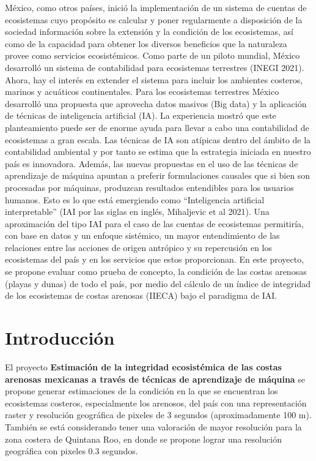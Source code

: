 \documentclass[
  letterpaper,
  DIV=11,
  numbers=noendperiod]{scrreprt}
\begin{document}
México, como otros países, inició la implementación de un sistema de
cuentas de ecosistemas cuyo propósito es calcular y poner regularmente a
disposición de la sociedad información sobre la extensión y la condición
de los ecosistemas, así como de la capacidad para obtener los diversos
beneficios que la naturaleza provee como servicios ecosistémicos. Como
parte de un piloto mundial, México desarrolló un sistema de contabilidad
para ecosistemas terrestres (INEGI 2021). Ahora, hay el interés en
extender el sistema para incluir los ambientes costeros, marinos y
acuáticos continentales. Para los ecosistemas terrestres México
desarrolló una propuesta que aprovecha datos masivos (Big data) y la
aplicación de técnicas de inteligencia artificial (IA). La experiencia
mostró que este planteamiento puede ser de enorme ayuda para llevar a
cabo una contabilidad de ecosistemas a gran escala. Las técnicas de IA
son atípicas dentro del ámbito de la contabilidad ambiental y por tanto
se estima que la estrategia iniciada en nuestro país es innovadora.
Además, las nuevas propuestas en el uso de las técnicas de aprendizaje
de máquina apuntan a preferir formulaciones causales que si bien son
procesadas por máquinas, produzcan resultados entendibles para los
usuarios humanos. Esto es lo que está emergiendo como ``Inteligencia
artificial interpretable'' (IAI por las siglas en inglés, Mihaljevic et
al 2021). Una aproximación del tipo IAI para el caso de las cuentas de
ecosistemas permitiría, con base en datos y un enfoque sistémico, un
mayor entendimiento de las relaciones entre las acciones de origen
antrópico y su repercusión en los ecosistemas del país y en los
servicios que estos proporcionan. En este proyecto, se propone evaluar
como prueba de concepto, la condición de las costas arenosas (playas y
dunas) de todo el país, por medio del cálculo de un índice de integridad
de los ecosistemas de costas arenosas (IIECA) bajo el paradigma de IAI.


\hypertarget{introducciuxf3n}{%
\chapter{Introducción}\label{introducciuxf3n}}

El proyecto \textbf{Estimación de la integridad ecosistémica de las
costas arenosas mexicanas a través de técnicas de aprendizaje de
máquina} se propone generar estimaciones de la condición en la que se
encuentran los ecosistemas costeros, especialmente los arenosos, del
país con una representación raster y resolución geográfica de pixeles de
3 segundos (aproximadamente 100 m). También se está considerando tener
una valoración de mayor resolución para la zona costera de Quintana Roo,
en donde se propone lograr una resolución geográfica con pixeles 0.3
segundos.
\end{document}
